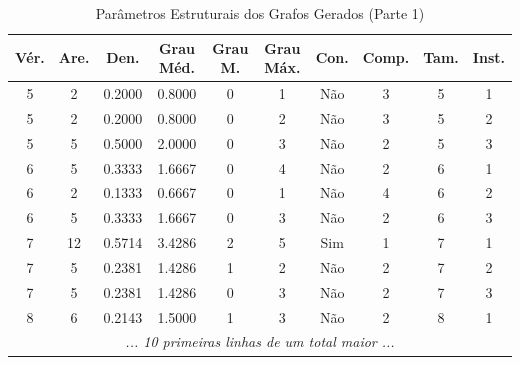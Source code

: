 \begin{table}[H]
\centering
\caption{Parâmetros Estruturais dos Grafos Gerados (Parte 1)}
\label{tab:parametros_grafos}
\footnotesize
\begin{tabular}{cccccccccc}
\toprule
\textbf{Vér.} & \textbf{Are.} & \textbf{Den.} & \textbf{Grau Méd.} & \textbf{Grau M.} & \textbf{Grau Máx.} & \textbf{Con.} & \textbf{Comp.} & \textbf{Tam.} & \textbf{Inst.} \\
\midrule
5 & 2 & 0.2000 & 0.8000 & 0 & 1 & Não & 3 & 5 & 1 \\
5 & 2 & 0.2000 & 0.8000 & 0 & 2 & Não & 3 & 5 & 2 \\
5 & 5 & 0.5000 & 2.0000 & 0 & 3 & Não & 2 & 5 & 3 \\
6 & 5 & 0.3333 & 1.6667 & 0 & 4 & Não & 2 & 6 & 1 \\
6 & 2 & 0.1333 & 0.6667 & 0 & 1 & Não & 4 & 6 & 2 \\
6 & 5 & 0.3333 & 1.6667 & 0 & 3 & Não & 2 & 6 & 3 \\
7 & 12 & 0.5714 & 3.4286 & 2 & 5 & Sim & 1 & 7 & 1 \\
7 & 5 & 0.2381 & 1.4286 & 1 & 2 & Não & 2 & 7 & 2 \\
7 & 5 & 0.2381 & 1.4286 & 0 & 3 & Não & 2 & 7 & 3 \\
8 & 6 & 0.2143 & 1.5000 & 1 & 3 & Não & 2 & 8 & 1 \\
\multicolumn{10}{c}{\textit{... 10 primeiras linhas de um total maior ...}} \\
\bottomrule
\end{tabular}
\end{table}
